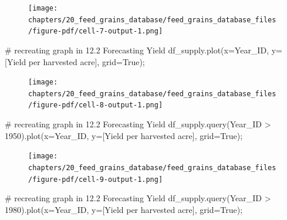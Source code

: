 \documentclass[
  letterpaper,
  DIV=11,
  numbers=noendperiod]{scrreprt}
\newenvironment{Shaded}{\begin{snugshade}}{\end{snugshade}}
\newcommand{\CommentTok}[1]{\textcolor[rgb]{0.37,0.37,0.37}{#1}}
\newcommand{\NormalTok}[1]{\textcolor[rgb]{0.00,0.23,0.31}{#1}}
\newcommand{\OperatorTok}[1]{\textcolor[rgb]{0.37,0.37,0.37}{#1}}
\newcommand{\StringTok}[1]{\textcolor[rgb]{0.13,0.47,0.30}{#1}}
\newcommand{\VariableTok}[1]{\textcolor[rgb]{0.07,0.07,0.07}{#1}}
\begin{document}
\begin{figure}[H]

{\centering \texttt{[image: chapters/20\_feed\_grains\_database/feed\_grains\_database\_files/figure-pdf/cell-7-output-1.png]}

}

\end{figure}

\begin{Shaded}
\begin{Highlighting}[]
\CommentTok{\# recreating graph in 12.2 Forecasting Yield}
\NormalTok{df\_supply.plot(x}\OperatorTok{=}\StringTok{\textquotesingle{}Year\_ID\textquotesingle{}}\NormalTok{, y}\OperatorTok{=}\NormalTok{[}\StringTok{\textquotesingle{}Yield per harvested acre\textquotesingle{}}\NormalTok{], grid}\OperatorTok{=}\VariableTok{True}\NormalTok{)}\OperatorTok{;}
\end{Highlighting}
\end{Shaded}

\begin{figure}[H]

{\centering \texttt{[image: chapters/20\_feed\_grains\_database/feed\_grains\_database\_files/figure-pdf/cell-8-output-1.png]}

}

\end{figure}

\begin{Shaded}
\begin{Highlighting}[]
\CommentTok{\# recreating graph in 12.2 Forecasting Yield}
\NormalTok{df\_supply.query(}\StringTok{\textquotesingle{}Year\_ID \textgreater{} 1950\textquotesingle{}}\NormalTok{).plot(x}\OperatorTok{=}\StringTok{\textquotesingle{}Year\_ID\textquotesingle{}}\NormalTok{, y}\OperatorTok{=}\NormalTok{[}\StringTok{\textquotesingle{}Yield per harvested acre\textquotesingle{}}\NormalTok{], grid}\OperatorTok{=}\VariableTok{True}\NormalTok{)}\OperatorTok{;}
\end{Highlighting}
\end{Shaded}

\begin{figure}[H]

{\centering \texttt{[image: chapters/20\_feed\_grains\_database/feed\_grains\_database\_files/figure-pdf/cell-9-output-1.png]}

}

\end{figure}

\begin{Shaded}
\begin{Highlighting}[]
\CommentTok{\# recreating graph in 12.2 Forecasting Yield}
\NormalTok{df\_supply.query(}\StringTok{\textquotesingle{}Year\_ID \textgreater{} 1980\textquotesingle{}}\NormalTok{).plot(x}\OperatorTok{=}\StringTok{\textquotesingle{}Year\_ID\textquotesingle{}}\NormalTok{, y}\OperatorTok{=}\NormalTok{[}\StringTok{\textquotesingle{}Yield per harvested acre\textquotesingle{}}\NormalTok{], grid}\OperatorTok{=}\VariableTok{True}\NormalTok{)}\OperatorTok{;}
\end{Highlighting}
\end{Shaded}
\end{document}
